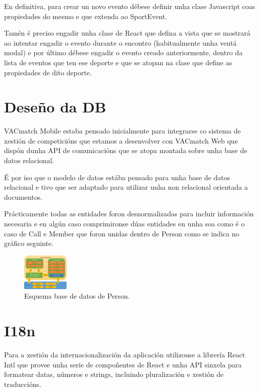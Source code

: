   En definitiva, para crear un novo evento débese definir unha clase Javascript 
coas propiedades do mesmo e que extenda ao SportEvent.

  Tamén é preciso engadir unha clase de React que defina a vista que se 
mostrará ao intentar engadir o evento durante o encontro (habitualmente unha 
ventá modal) e por último débese engadir o evento creado anteriormente, dentro 
da lista de eventos que ten ese deporte e que se atopan na clase que define as 
propiedades de dito deporte.

  \section{Deseño da DB}
  VACmatch Mobile estaba pensado inicialmente para integrarse co sistema de 
xestión de competicións que estamos a desenvolver con VACmatch Web que dispón 
dunha API de comunicacións que se atopa montada sobre unha base de datos 
relacional.

  É por iso que o modelo de datos estába pensado para unha base de 
datos relacional e tivo que ser adaptado para utilizar unha non relacional 
orientada a documentos.

  Prácticamente todas as entidades foron desnormalizadas para incluir 
información necesaria e en algún caso comprimironse dúas entidades en unha soa 
como é o caso de Call e Member que foron unidas dentro de Person como se indica 
no gráfico seguinte.

    \begin{figure}[h!]
      \begin{center}
      \includegraphics[width=0.2\textwidth]{./img/cordova_arquitectura.png}
      \caption{Esquema base de datos de Person.}
      \end{center}
    \end{figure}

  \section{I18n}
  Para a xestión da internacionalización da aplicación utilizouse a librería 
React Intl que provee unha serie de compoñentes de React e unha API sinxela 
para formatear datas, números e strings, incluindo pluralización e xestión de 
traduccións.

